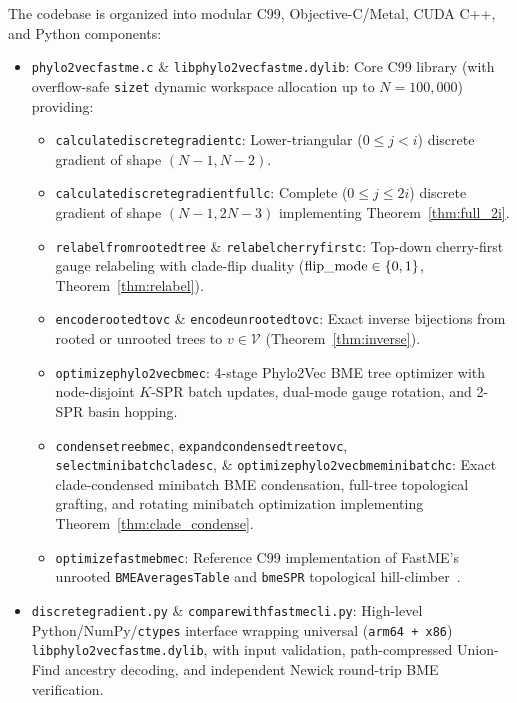\documentclass[11pt,a4paper]{article}
\makeatletter
\DeclareRobustCommand{\_}{\ifmmode\nfss@text{\textunderscore}\else\textunderscore\allowbreak\fi}
\theoremstyle{definition}
\makeatother
\begin{document}
The codebase is organized into modular C99, Objective-C/Metal, CUDA C++, and Python components:
\begin{itemize}
    \item \texttt{phylo2vec\_fastme.c} \& \texttt{libphylo2vec\_fastme.dylib}: Core C99 library (with overflow-safe \texttt{size\_t} dynamic workspace allocation up to $N = 100{,}000$) providing:
    \begin{itemize}
        \item \texttt{calculate\_discrete\_gradient\_c}: Lower-triangular ($0 \le j < i$) discrete gradient of shape $(N-1, N-2)$.
        \item \texttt{calculate\_discrete\_gradient\_full\_c}: Complete ($0 \le j \le 2i$) discrete gradient of shape $(N-1, 2N-3)$ implementing Theorem~\ref{thm:full_2i}.
        \item \texttt{relabel\_from\_rooted\_tree} \& \texttt{relabel\_cherry\_first\_c}: Top-down cherry-first gauge relabeling with clade-flip duality ($\text{flip\_mode} \in \{0, 1\}$, Theorem~\ref{thm:relabel}).
        \item \texttt{encode\_rooted\_to\_v\_c} \& \texttt{encode\_unrooted\_to\_v\_c}: Exact inverse bijections from rooted or unrooted trees to $v \in \mathcal{V}$ (Theorem~\ref{thm:inverse}).
        \item \texttt{optimize\_phylo2vec\_bme\_c}: 4-stage Phylo2Vec BME tree optimizer with node-disjoint $K$-SPR batch updates, dual-mode gauge rotation, and 2-SPR basin hopping.
        \item \texttt{condense\_tree\_bme\_c}, \texttt{expand\_condensed\_tree\_to\_v\_c}, \texttt{select\_minibatch\_clades\_c}, \& \texttt{optimize\_phylo2vec\_bme\_minibatch\_c}: Exact clade-condensed minibatch BME condensation, full-tree topological grafting, and rotating minibatch optimization implementing Theorem~\ref{thm:clade_condense}.
        \item \texttt{optimize\_fastme\_bme\_c}: Reference C99 implementation of FastME's unrooted \texttt{BMEAveragesTable} and \texttt{bmeSPR} topological hill-climber~\cite{desper2002fast,lefort2015fastme}.
    \end{itemize}
    \item \texttt{discrete\_gradient.py} \& \texttt{compare\_with\_fastme\_cli.py}: High-level Python/NumPy/\texttt{ctypes} interface wrapping universal (\texttt{arm64 + x86\_64}) \texttt{libphylo2vec\_fastme.dylib}, with input validation, path-compressed Union-Find ancestry decoding, and independent Newick round-trip BME verification.

\end{itemize}
\end{document}
